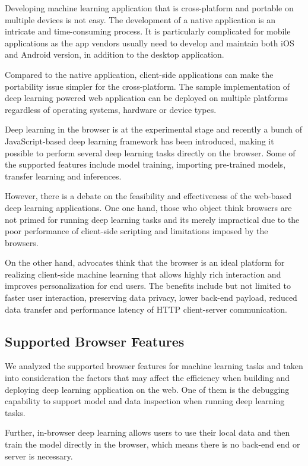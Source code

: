 Developing machine learning application that is cross-platform and portable on multiple devices is not easy. The development of a native application is an intricate and time-consuming process. It is particularly complicated for mobile applications as the app vendors usually need to develop and maintain both iOS and Android version, in addition to the desktop application.

Compared to the native application, client-side applications can make the portability issue simpler for the cross-platform. The sample implementation of deep learning powered web application can be deployed on multiple platforms regardless of operating systems, hardware or device types.

Deep learning in the browser is at the experimental stage and recently a bunch of JavaScript-based deep learning framework has been introduced, making it possible to perform several deep learning tasks directly on the browser. Some of the supported features include model training, importing pre-trained models, transfer learning and inferences.

However, there is a debate on the feasibility and effectiveness of the web-based deep learning applications. One one hand, those who object think browsers are not primed for running deep learning tasks and its merely impractical due to the poor performance of client-side scripting and limitations imposed by the browsers. 

On the other hand, advocates think that the browser is an ideal platform for realizing client-side machine learning that allows highly rich interaction and improves personalization for end users. The benefits include but not limited to faster user interaction, preserving data privacy, lower back-end payload, reduced data transfer and performance latency of HTTP client-server communication.

\subsection{Supported Browser Features}
We analyzed the supported browser features for machine learning tasks and taken into consideration the factors that may affect the efficiency when building and deploying deep learning application on the web. One of them is the debugging capability to support model and data inspection when running deep learning tasks.

Further, in-browser deep learning allows users to use their local data and then train the model directly in the browser, which means there is no back-end end or server is necessary. 

